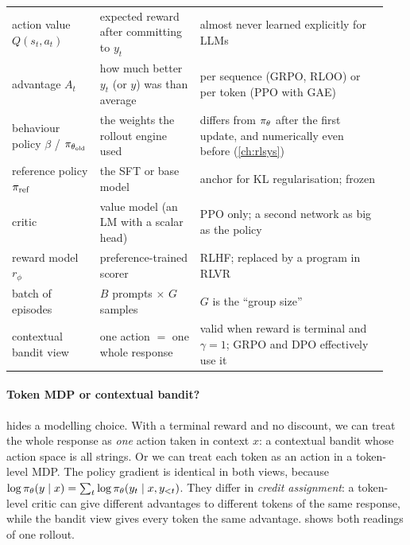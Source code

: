 {\begin{longtable}{@{}p{0.22\linewidth}p{0.25\linewidth}p{0.47\linewidth}@{}}
action value $Q(s_t,a_t)$ & expected reward after committing to $y_t$ & almost never learned explicitly for LLMs\\
advantage $A_t$ & how much better $y_t$ (or $y$) was than average & per sequence (GRPO, RLOO) or per token (PPO with GAE)\\
behaviour policy $\beta$ / $\pi_{\theta_{\text{old}}}$ & the weights the rollout engine used & differs from $\pi_\theta$ after the first update, and numerically even before (\cref{ch:rlsys})\\
reference policy $\pi_{\text{ref}}$ & the SFT or base model & anchor for KL regularisation; frozen\\
critic & value model (an LM with a scalar head) & PPO only; a second network as big as the policy\\
reward model $r_\phi$ & preference-trained scorer & RLHF; replaced by a program in RLVR\\
batch of episodes & $B$ prompts $\times$ $G$ samples & $G$ is the ``group size''\\
contextual bandit view & one action $=$ one whole response & valid when reward is terminal and $\gamma=1$; GRPO and DPO effectively use it\\
\bottomrule
\end{longtable}}

\paragraph{Token MDP or contextual bandit?}  hides a modelling choice.
With a terminal reward and no discount, we can treat the whole response as \emph{one} action
taken in context $x$: a contextual bandit whose action space is all strings. Or we can treat
each token as an action in a token-level MDP. The policy gradient is identical in both views,
because $\log\pi_\theta(y\mid x)=\sum_t\log\pi_\theta(y_t\mid x,y_{<t})$. They differ in
\emph{credit assignment}: a token-level critic can give different advantages to different
tokens of the same response, while the bandit view gives every token the same advantage.
 shows both readings of one rollout.

